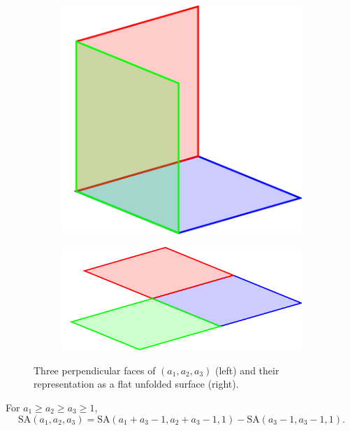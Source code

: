 \begin{figure}[]
\centering
\begin{subfigure}[b]{0.35\textwidth}
	\includegraphics[width=\textwidth]{figures/3/manifold_a.pdf}
	\label{fig:manifold_a}
\end{subfigure} \hfill%
\begin{subfigure}[b]{0.55\textwidth}
	\includegraphics[width=\textwidth]{figures/3/manifold_flat.pdf}
	\label{fig:manifold_b}
\end{subfigure}
\caption{Three perpendicular faces of $(a_1,a_2,a_3)$ (left) and their representation as a flat unfolded surface (right).}
\label{fig:manifold_types}
\end{figure} 

\begin{lem}
For $a_1 \geq a_2 \geq a_3 \geq 1$, 
$$\text{SA}(a_1, a_2, a_3) = \text{SA}(a_1+a_3-1, a_2+a_3-1, 1) - \text{SA}(a_3-1, a_3-1, 1).$$
\end{lem}

